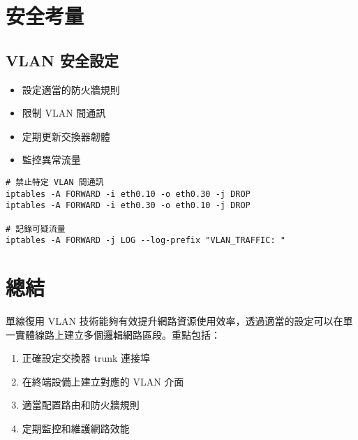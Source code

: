 \documentclass[12pt,a4paper]{article}
\begin{document}
\section{安全考量}

\subsection{VLAN 安全設定}

\begin{itemize}
    \item 設定適當的防火牆規則
    \item 限制 VLAN 間通訊
    \item 定期更新交換器韌體
    \item 監控異常流量
\end{itemize}

\begin{lstlisting}[caption=防火牆規則範例]
# 禁止特定 VLAN 間通訊
iptables -A FORWARD -i eth0.10 -o eth0.30 -j DROP
iptables -A FORWARD -i eth0.30 -o eth0.10 -j DROP

# 記錄可疑流量
iptables -A FORWARD -j LOG --log-prefix "VLAN_TRAFFIC: "
\end{lstlisting}

\section{總結}

單線復用 VLAN 技術能夠有效提升網路資源使用效率，透過適當的設定可以在單一實體線路上建立多個邏輯網路區段。重點包括：

\begin{enumerate}
    \item 正確設定交換器 trunk 連接埠
    \item 在終端設備上建立對應的 VLAN 介面
    \item 適當配置路由和防火牆規則
    \item 定期監控和維護網路效能
\end{enumerate}
\end{document}
